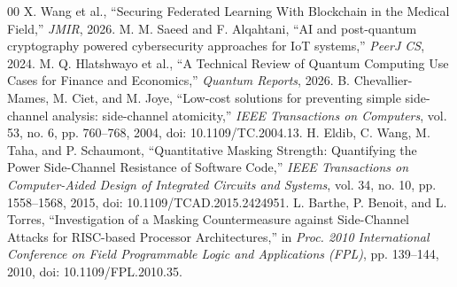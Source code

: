 \documentclass[journal, 10pt, twocolumn]{IEEEtran}
\begin{document}
\begin{thebibliography}{00}
 X. Wang et al., ``Securing Federated Learning With Blockchain in the Medical Field,'' \textit{JMIR}, 2026.
 M. M. Saeed and F. Alqahtani, ``AI and post-quantum cryptography powered cybersecurity approaches for IoT systems,'' \textit{PeerJ CS}, 2024.
 M. Q. Hlatshwayo et al., ``A Technical Review of Quantum Computing Use Cases for Finance and Economics,'' \textit{Quantum Reports}, 2026.
 B. Chevallier-Mames, M. Ciet, and M. Joye, ``Low-cost solutions for preventing simple side-channel analysis: side-channel atomicity,'' \textit{IEEE Transactions on Computers}, vol. 53, no. 6, pp. 760--768, 2004, doi: 10.1109/TC.2004.13.
 H. Eldib, C. Wang, M. Taha, and P. Schaumont, ``Quantitative Masking Strength: Quantifying the Power Side-Channel Resistance of Software Code,'' \textit{IEEE Transactions on Computer-Aided Design of Integrated Circuits and Systems}, vol. 34, no. 10, pp. 1558--1568, 2015, doi: 10.1109/TCAD.2015.2424951.
 L. Barthe, P. Benoit, and L. Torres, ``Investigation of a Masking Countermeasure against Side-Channel Attacks for RISC-based Processor Architectures,'' in \textit{Proc. 2010 International Conference on Field Programmable Logic and Applications (FPL)}, pp. 139--144, 2010, doi: 10.1109/FPL.2010.35.
\end{thebibliography}
\end{document}
